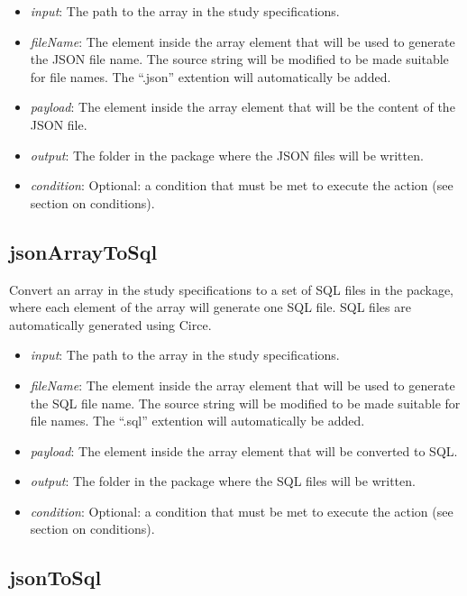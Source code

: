 \documentclass[]{article}
\providecommand{\tightlist}{%
  \setlength{\itemsep}{0pt}\setlength{\parskip}{0pt}}
\begin{document}
\begin{itemize}
\tightlist
\item
  \emph{input}: The path to the array in the study specifications.
\item
  \emph{fileName}: The element inside the array element that will be
  used to generate the JSON file name. The source string will be
  modified to be made suitable for file names. The ``.json'' extention
  will automatically be added.
\item
  \emph{payload}: The element inside the array element that will be the
  content of the JSON file.
\item
  \emph{output}: The folder in the package where the JSON files will be
  written.
\item
  \emph{condition}: Optional: a condition that must be met to execute
  the action (see section on conditions).
\end{itemize}

\hypertarget{jsonarraytosql}{%
\subsection{jsonArrayToSql}\label{jsonarraytosql}}

Convert an array in the study specifications to a set of SQL files in
the package, where each element of the array will generate one SQL file.
SQL files are automatically generated using Circe.

\begin{itemize}
\tightlist
\item
  \emph{input}: The path to the array in the study specifications.
\item
  \emph{fileName}: The element inside the array element that will be
  used to generate the SQL file name. The source string will be modified
  to be made suitable for file names. The ``.sql'' extention will
  automatically be added.
\item
  \emph{payload}: The element inside the array element that will be
  converted to SQL.
\item
  \emph{output}: The folder in the package where the SQL files will be
  written.
\item
  \emph{condition}: Optional: a condition that must be met to execute
  the action (see section on conditions).
\end{itemize}

\hypertarget{jsontosql}{%
\subsection{jsonToSql}\label{jsontosql}}
\end{document}
